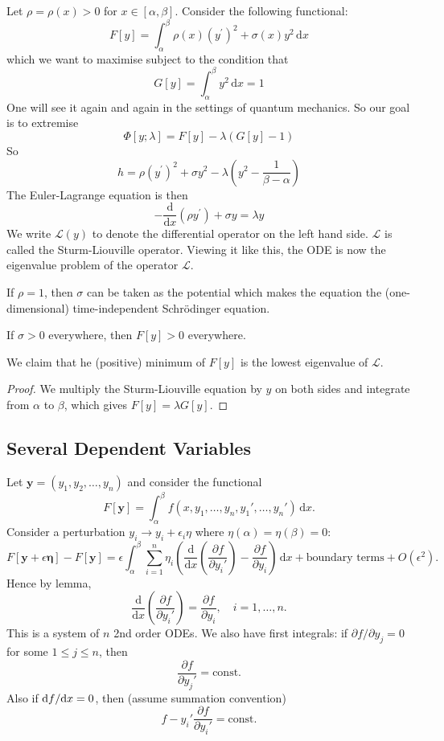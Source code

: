 \documentclass[a4paper]{article}
\begin{document}
\begin{example}\label{sturm-liouville}
    Let $\rho=\rho(x)>0$ for $x\in [\alpha,\beta]$.
    Consider the following functional:
    $$F[y]=\int_\alpha^\beta\rho(x)(y^\prime)^2+\sigma(x)y^2\,\mathrm dx$$
    which we want to maximise subject to the condition that
    $$G[y]=\int_\alpha^\beta y^2\,\mathrm dx=1$$
    One will see it again and again in the settings of quantum mechanics.
    So our goal is to extremise
    $$\Phi[y;\lambda]=F[y]-\lambda(G[y]-1)$$
    So
    $$h=\rho(y^\prime)^2+\sigma y^2-\lambda\left( y^2-\frac{1}{\beta-\alpha} \right)$$
    The Euler-Lagrange equation is then
    $$-\frac{\mathrm d}{\mathrm dx}(\rho y^\prime)+\sigma y=\lambda y$$
    We write $\mathcal L(y)$ to denote the differential operator on the left hand side.
    $\mathcal L$ is called the Sturm-Liouville operator.
    Viewing it like this, the ODE is now the eigenvalue problem of the operator $\mathcal L$.
\end{example}
\begin{remark}
    If $\rho=1$, then $\sigma$ can be taken as the potential which makes the equation the (one-dimensional) time-independent Schr\"odinger equation.
\end{remark}
If $\sigma>0$ everywhere, then $F[y]>0$ everywhere.
\begin{claim}
    We claim that he (positive) minimum of $F[y]$ is the lowest eigenvalue of $\mathcal L$.
\end{claim}
\begin{proof}
    We multiply the Sturm-Liouville equation by $y$ on both sides and integrate from $\alpha$ to $\beta$, which gives $F[y]=\lambda G[y]$.
\end{proof}

\subsection{Several Dependent Variables}
Let $ \mathbf{y}=(y_1,y_2,\dots,y_n) $ and consider the functional 
\[
    F[\mathbf{y}] = \int_{\alpha}^{\beta} f(x,y_1,\dots,y_n, y_1',\dots,y_n') \,\mathrm{d}x.
\]
Consider a perturbation $ y_i \to y_i + \epsilon_i \eta $ where $ \eta(\alpha)=\eta(\beta)=0 $:
\[
    F[\mathbf{y}+\epsilon \boldsymbol{\eta}] - F[\mathbf{y}] = \epsilon\int_{\alpha}^{\beta} \sum_{i=1}^{n} \eta_i\left( \frac{\mathrm{d}}{\mathrm{d}x}\left( \frac{\partial f}{\partial y_i'}  \right) -\frac{\partial f}{\partial y_i} \right)  \,\mathrm{d}x + \text{boundary terms} + O(\epsilon^2).
\]
Hence by lemma, 
\[
    \frac{\mathrm{d}}{\mathrm{d}x}\left( \frac{\partial f}{\partial y_i'}  \right) = \frac{\partial f}{\partial y_i},\quad i=1,\dots,n.  
\]
This is a system of $n$ 2nd order ODEs. We also have first integrals: if $ \partial f/\partial y_j=0  $ for some $ 1\le j\le n $, then 
\[
    \frac{\partial f}{\partial y_j'}=\text{const}. 
\]
Also if $ \mathrm{d} f / \mathrm{d} x = 0 $, then (assume summation convention)
\[
    f - y_i' \frac{\partial f}{\partial y_i'}= \text{const}. 
\]
\newpage
\end{document}
